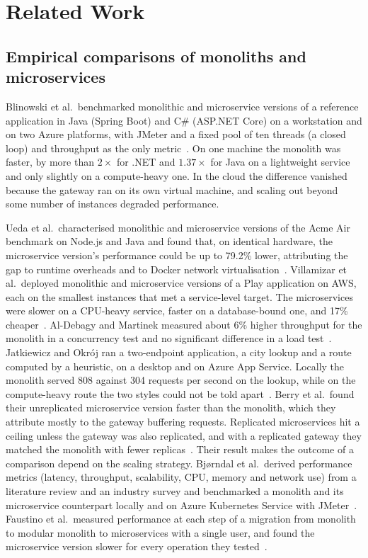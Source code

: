 \section{Related Work}
\label{sec:related}

\subsection{Empirical comparisons of monoliths and microservices}
\label{sec:rw-comparisons}

Blinowski et al.\ benchmarked monolithic and microservice versions of a reference application in Java
(Spring Boot) and C\# (ASP.NET Core) on a workstation and on two Azure platforms, with JMeter and a fixed pool of
ten threads (a closed loop) and throughput as the only metric~\cite{Blinowski2022}. On one machine the monolith
was faster, by more than $2\times$ for .NET and $1.37\times$ for Java on a lightweight service and only slightly
on a compute-heavy one. In the cloud the difference vanished because the gateway ran on its own virtual machine,
and scaling out beyond some number of instances degraded performance.

Ueda et al.\ characterised monolithic and microservice versions of the Acme Air benchmark on
Node.js and Java and found that, on identical hardware, the microservice version's performance
could be up to 79.2\% lower, attributing the gap to runtime overheads and to Docker network
virtualisation~\cite{Ueda2016}. Villamizar et al.\ deployed monolithic and microservice versions of
a Play application on AWS, each on the smallest instances that met a service-level target. The microservices were
slower on a CPU-heavy service, faster on a database-bound one, and 17\% cheaper~\cite{Villamizar2015}. Al-Debagy and Martinek measured about 6\% higher
throughput for the monolith in a concurrency test and no significant difference in a load
test~\cite{AlDebagy2018}. Jatkiewicz and Okr\'oj ran a two-endpoint application, a city lookup and a route computed by a
heuristic, on a desktop and on Azure App Service. Locally the monolith served 808 against 304 requests per second
on the lookup, while on the compute-heavy route the two styles could not be told apart~\cite{Jatkiewicz2023}. Berry et al.\ found their unreplicated microservice
version faster than the monolith, which they attribute mostly to the gateway buffering requests. Replicated
microservices hit a ceiling unless the gateway was also replicated, and with a replicated gateway they matched the
monolith with fewer replicas~\cite{Berry2024}. Their result makes the outcome of a
comparison depend on the scaling strategy. Bj{\o}rndal et al.\ derived performance metrics
(latency, throughput, scalability, CPU, memory and network use) from a literature review and an
industry survey and benchmarked a monolith and its microservice counterpart locally and on Azure
Kubernetes Service with JMeter~\cite{Bjorndal2021}. Faustino et al.\ measured performance at each
step of a migration from monolith to modular monolith to microservices with a single user, and found the
microservice version slower for every operation they tested~\cite{Faustino2024}.

